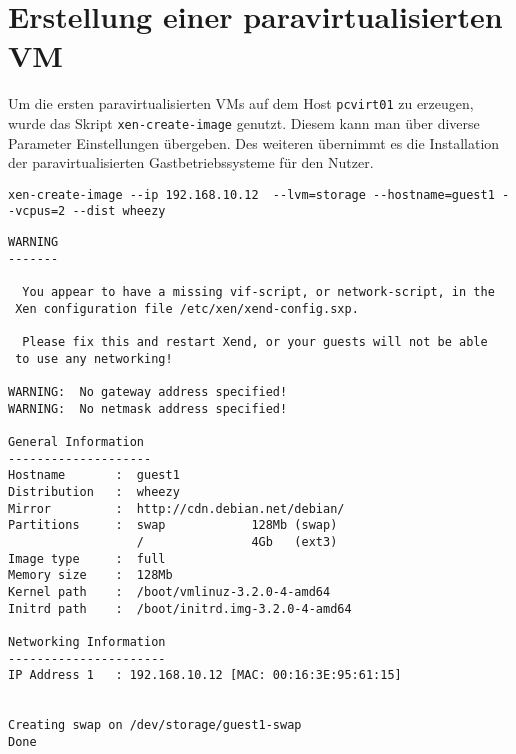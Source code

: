 \section{Erstellung einer paravirtualisierten VM}
Um die ersten paravirtualisierten VMs auf dem Host \verb#pcvirt01# zu erzeugen, wurde das Skript \verb#xen-create-image# genutzt. Diesem kann man über diverse Parameter Einstellungen übergeben. Des weiteren übernimmt es die Installation der paravirtualisierten Gastbetriebssysteme für den Nutzer.
\begin{verbatim}
xen-create-image --ip 192.168.10.12  --lvm=storage --hostname=guest1 --vcpus=2 --dist wheezy
\end{verbatim}
\setupVerbatimOut
\begin{verbatim}                                                  
WARNING                                           
-------                                           
                                                  
  You appear to have a missing vif-script, or network-script, in the
 Xen configuration file /etc/xen/xend-config.sxp. 
                                                  
  Please fix this and restart Xend, or your guests will not be able
 to use any networking!                           
                                                  
WARNING:  No gateway address specified!           
WARNING:  No netmask address specified!           
                                                  
General Information                               
--------------------                              
Hostname       :  guest1                          
Distribution   :  wheezy                          
Mirror         :  http://cdn.debian.net/debian/   
Partitions     :  swap            128Mb (swap)    
                  /               4Gb   (ext3)    
Image type     :  full                            
Memory size    :  128Mb                           
Kernel path    :  /boot/vmlinuz-3.2.0-4-amd64     
Initrd path    :  /boot/initrd.img-3.2.0-4-amd64  
                                                  
Networking Information                            
----------------------                            
IP Address 1   : 192.168.10.12 [MAC: 00:16:3E:95:61:15]
                                                  
                                                  
Creating swap on /dev/storage/guest1-swap         
Done                                              
                                                  

\end{verbatim}

